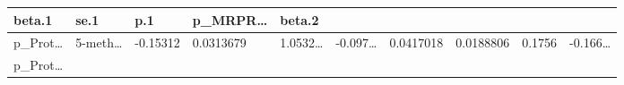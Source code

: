 \documentclass[
]{article}
\begin{document}
\begin{longtable}[]{@{}llllllllll@{}}
\begin{minipage}[b]{0.07\columnwidth}
beta.1\strut
\end{minipage} & \begin{minipage}[b]{0.07\columnwidth}\raggedright
se.1\strut
\end{minipage} & \begin{minipage}[b]{0.07\columnwidth}\raggedright
p.1\strut
\end{minipage} & \begin{minipage}[b]{0.07\columnwidth}\raggedright
p\_MRPR\ldots{}\strut
\end{minipage} & \begin{minipage}[b]{0.07\columnwidth}\raggedright
beta.2\strut
\end{minipage}\tabularnewline
\midrule
\endhead
\begin{minipage}[t]{0.07\columnwidth}\raggedright
p\_Prot\ldots{}\strut
\end{minipage} & \begin{minipage}[t]{0.07\columnwidth}\raggedright
5-meth\ldots{}\strut
\end{minipage} & \begin{minipage}[t]{0.07\columnwidth}\raggedright
-0.15312\strut
\end{minipage} & \begin{minipage}[t]{0.07\columnwidth}\raggedright
0.0313679\strut
\end{minipage} & \begin{minipage}[t]{0.07\columnwidth}\raggedright
1.0532\ldots{}\strut
\end{minipage} & \begin{minipage}[t]{0.07\columnwidth}\raggedright
-0.097\ldots{}\strut
\end{minipage} & \begin{minipage}[t]{0.07\columnwidth}\raggedright
0.0417018\strut
\end{minipage} & \begin{minipage}[t]{0.07\columnwidth}\raggedright
0.0188806\strut
\end{minipage} & \begin{minipage}[t]{0.07\columnwidth}\raggedright
0.1756\strut
\end{minipage} & \begin{minipage}[t]{0.07\columnwidth}\raggedright
-0.166\ldots{}\strut
\end{minipage}\tabularnewline
\begin{minipage}[t]{0.07\columnwidth}\raggedright
p\_Prot\ldots{}\strut
\end{minipage} & \begin{minipage}[t]{0.07\columnwidth}\raggedright

\end{minipage}
\end{longtable}
\end{document}
